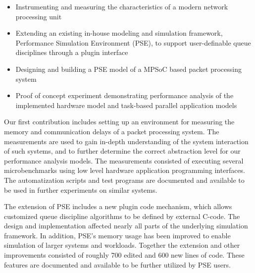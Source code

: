 \begin{itemize}

\item Instrumenting and measuring the characteristics of a modern network processing unit

\item Extending an existing in-house modeling and simulation framework, Performance Simulation Environment (PSE), to support user-definable queue disciplines through a plugin interface %


\item Designing and building a PSE model of a MPSoC based packet processing system


\item Proof of concept experiment demonstrating performance analysis of the implemented hardware model and task-based parallel application models

\end{itemize}

Our first contribution includes setting up an environment for measuring the memory and communication delays of a packet processing system. The measurements are used to gain in-depth understanding of the system interaction of such systems, and to further determine the correct abstraction level for our performance analysis models. The measurements consisted of executing several microbenchmarks using low level hardware application programming interfaces. The automatization scripts and test programs are documented and available to be used in further experiments on similar systems.

The extension of PSE includes a new plugin code mechanism, which allows customized queue discipline algorithms to be defined by external C-code. The design and implementation affected nearly all parts of the underlying simulation framework. In addition, PSE's memory usage has been improved to enable simulation of larger systems and workloads. Together the extension and other improvements consisted of roughly 700 edited and 600 new lines of code. These features are documented and available to be further utilized by PSE users.

